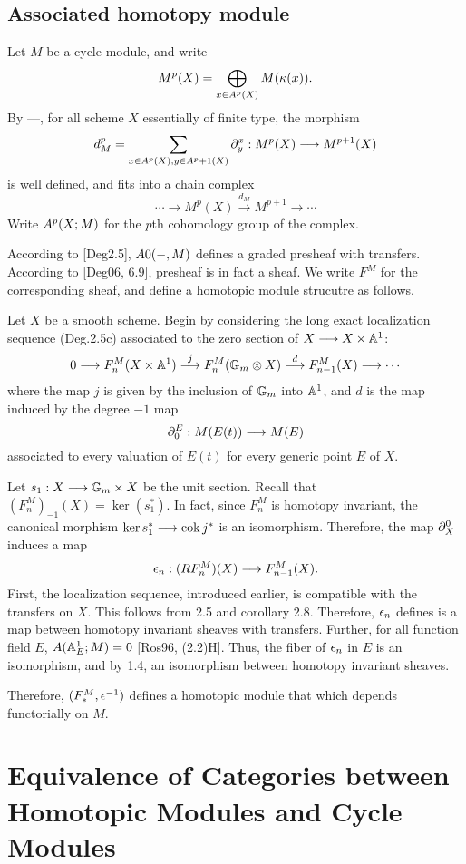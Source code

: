\subsection{Associated homotopy module}

Let $M$ be a cycle module, and write 
\[
M^p(X) = \bigoplus_{x \in \subsch{p}{X}} M(\resf{x}).
\] 
By ---, for all scheme $X$ essentially of finite type, the 
morphism
\[
d_M^p = \sum_{x \in \subsch{p}{X}, y \in \subsch{p + 1}{X}} 
\ptres{x}{y} : M^p(X) \to M^{p + 1}(X)
\]
is well defined, and fits into a chain complex
\[
\cdots \to M^p(X) \stackrel{d_M}{\to} M^{p + 1} \to \cdots
\]
Write $\cmcohom^p(X; M)$ for the $p$th cohomology group of the 
complex.

According to [Deg2.5], $\cmcohom{0}(-,M)$ defines a graded 
presheaf with transfers. According to [Deg06, 6.9], presheaf is 
in fact a sheaf. We write $F^M$ for the corresponding sheaf, and 
define a homotopic module strucutre as follows.

Let $X$ be a smooth scheme. Begin by considering the long exact
localization sequence (Deg.2.5c) associated to the zero section of
$X \to X \times \A^1$:
\[
0 \to F^M_n(X \times \A^1) \stackrel{j}{\to} F^M_n(\Gmpt \otimes X) 
   \stackrel{d}{\to} F^M_{n - 1}(X) \to \cdots
\]
where the map $j$ is given by the inclusion of $\Gmpt$ into $\A^1$,
and $d$ is the map induced by the degree $-1$ map
\[
\ptres{E}{0}: M(E(t)) \to M(E)
\]
associated to every valuation of $E(t)$ for every generic point 
$E$ of $X$.

Let $s_1: X \to \Gmpt \times X$ be the unit section. Recall that
$(F^M_n)_{-1}(X) = \ker (s_1^*)$. In fact, since $F^M_n$ is 
homotopy invariant, the canonical morphism $\ker s_1^* \to
\cok j^*$ is an isomorphism. Therefore, the map $\ptres{0}{X}$ 
induces a map
\[
\loopCM_n : (RF^M_{n})(X) \to F^M_{n - 1}(X).
\]
First, the localization sequence, introduced earlier, is 
compatible with the transfers on $X$. This follows from 2.5 and 
corollary 2.8. Therefore, $\loopCM_n$ defines is a map between 
homotopy invariant sheaves with transfers. Further, for all 
function field $E$, $\cmcohom(\A^1_E; M) = 0$ [Ros96, (2.2)H]. 
Thus, the fiber of $\loopCM_n$ in $E$ is an isomorphism, and by 
1.4, an isomorphism between homotopy invariant sheaves.

Therefore, $(F^M_*, \loopCM^{-1})$ defines a homotopic module that
which depends functorially on $M$.

\section{Equivalence of Categories between Homotopic Modules and 
Cycle Modules}


